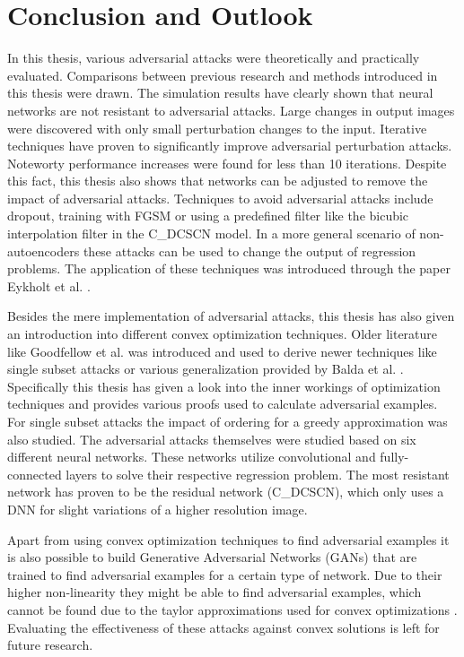\chapter{Conclusion and Outlook}\label{sec:section}

\begingroup
In this thesis, various adversarial attacks were theoretically and practically evaluated. Comparisons
between previous research and methods introduced in this thesis were drawn.
The simulation results have clearly shown that neural networks
are not resistant to adversarial attacks. Large changes in output images were discovered with only small perturbation
changes to the input. Iterative techniques have proven to significantly improve adversarial perturbation attacks. Noteworty
performance increases were found for less than 10 iterations.
Despite this fact, this thesis also shows that networks can be adjusted to remove
the impact of adversarial attacks. Techniques to avoid adversarial attacks include dropout, training with FGSM or using
a predefined filter like the bicubic interpolation filter in the C\_DCSCN model. In a more general
scenario of non-autoencoders these attacks can be used to change the output of regression problems.
The application of these techniques was introduced through the paper Eykholt et al. \cite{RealWorld}.

Besides the mere implementation of adversarial attacks, this thesis has also given an introduction into different
convex optimization techniques. Older literature like Goodfellow et al. \cite{Goodfellow} was introduced
and used to derive newer techniques like single subset attacks or various generalization provided by
Balda et al. \cite{NeuralError}. Specifically this thesis has given a look into the inner workings of optimization
techniques and provides various proofs used to calculate adversarial examples. For single subset
attacks the impact of ordering for a greedy approximation was also studied.
The adversarial attacks themselves were studied based on six different neural networks. These networks utilize
convolutional and fully-connected layers to solve their respective regression problem. The most resistant network
has proven to be the residual network (C\_DCSCN), which only uses a DNN for slight
variations of a higher resolution image.

Apart from using convex optimization techniques to find adversarial examples it is also possible to build
Generative Adversarial Networks (GANs) that are trained to find adversarial examples for a certain type
of network. Due to their higher non-linearity they might be able to find adversarial examples, which cannot be
found due to the taylor approximations used for convex optimizations \cite{GAN}. Evaluating the effectiveness of
these attacks against convex solutions is left for future research.
\endgroup
